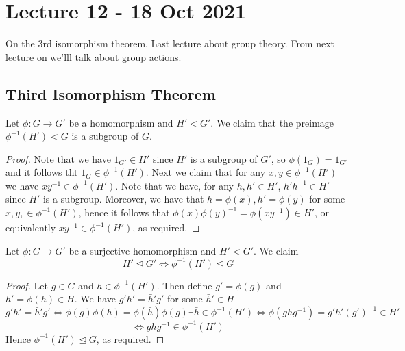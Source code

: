 \section{Lecture 12 - 18 Oct 2021}
On the 3rd isomorphism theorem. Last lecture about group theory. From next lecture on
we'lll talk about group actions. 
\subsection{Third Isomorphism Theorem}
\begin{lemma}[Sheet 2, Q5]
  Let $\phi:G\to G'$ be a homomorphism and $H'<G'$. We claim that the preimage
  $\phi^{-1}(H')<G$ is a subgroup of $G$. 
  \label{lem:preImgSubgroup}
\end{lemma}
\begin{proof}
  Note that we have $1_{G'}\in H'$ since $H'$ is a subgroup of $G'$, so
  $\phi(1_{G})=1_{G'}$ and it follows tht $1_{G}\in \phi^{-1}(H')$. Next we claim that for
  any $x,y\in\phi^{-1}(H')$ we have $xy^{-1}\in\phi^{-1}(H')$. Note that we have, for any
  $h,h'\in H'$, $h'h^{-1}\in H'$ since $H'$ is a subgroup. Moreover, we have that
  $h=\phi(x),h'=\phi(y)$ for some $x,y,\in\phi^{-1}(H')$, hence it follows that
  $\phi(x)\phi(y)^{-1} = \phi(xy^{-1})\in H'$, or equivalently $xy^{-1}\in\phi^{-1}(H')$,
  as required.
\end{proof}

\begin{lemma}
  Let $\phi:G\to G'$ be a surjective homomorphism and $H'<G'$. We claim 
  \[H'\trianglelefteq G' \iff \phi^{-1}(H')\trianglelefteq G\]
  \label{lem:preImgNormSub}
\end{lemma}
\begin{proof}
  Let $g\in G$ and $h\in \phi^{-1}(H')$. Then define $g'=\phi(g)$ and $h'=\phi(h)\in H$.
  We have $g'h' = \bar{h}'g'$ for some $\bar{h}'\in H$
  \[g'h' = \bar{h}'g' \iff \phi(g)\phi(h)  =\phi(\bar{h})\phi(g) \exists
  \bar{h}\in\phi^{-1}(H') \iff \phi(ghg^{-1}) = g'h'(g')^{-1} \in H'\]
  \[\iff ghg^{-1}\in \phi^{-1}(H')\]
  Hence $\phi^{-1}(H')\trianglelefteq G$, as required.
\end{proof}

